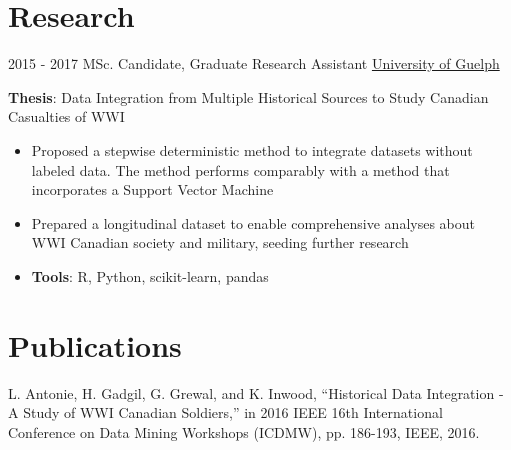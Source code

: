 \documentclass[letterpaper]{twentysecondcv} %
\begin{document}
\section{Research}
\begin{twenty}
	\twentyitem
    	{2015 - 2017}
		{}
        {MSc. Candidate, Graduate Research Assistant}
        {\href{http://www.uoguelph.ca/}{University of Guelph}}
        {}
        {
       	\textbf{Thesis}: Data Integration from Multiple Historical Sources to Study Canadian Casualties of WWI
        {\begin{itemize}
        \item Proposed a stepwise deterministic method to integrate datasets without labeled data. The method performs comparably with a method that incorporates a Support Vector Machine
        \item Prepared a longitudinal dataset to enable comprehensive analyses about WWI Canadian society and military, seeding further research
        \item \textbf{Tools}: R, Python, scikit-learn, pandas \vspace{2mm}
		\end{itemize}}
        }
\end{twenty}

\section{Publications}
L. Antonie, H. Gadgil, G. Grewal, and K. Inwood, “Historical Data Integration - A Study of WWI Canadian Soldiers,” in 2016 IEEE 16th International Conference on Data Mining Workshops (ICDMW), pp. 186-193, IEEE, 2016. \vspace{2mm}
\end{document}
